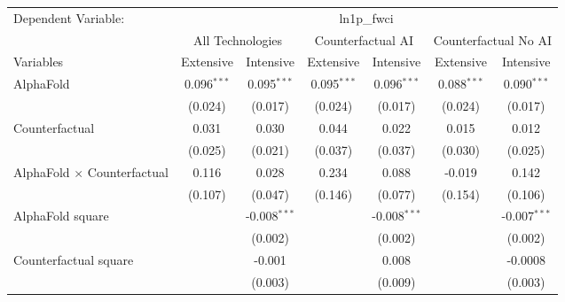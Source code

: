 \begingroup
\centering
\begin{tabular}{lcccccc}
   \tabularnewline \midrule \midrule
   Dependent Variable: & \multicolumn{6}{c}{ln1p\_fwci}\\
 & \multicolumn{2}{c}{All Technologies} & \multicolumn{2}{c}{Counterfactual AI} & \multicolumn{2}{c}{Counterfactual No AI} \\
\cmidrule(lr){1-1}\cmidrule(lr){2-3} \cmidrule(lr){4-5} \cmidrule(lr){6-7}
Variables & \multicolumn{1}{c}{Extensive} & \multicolumn{1}{c}{Intensive} & \multicolumn{1}{c}{Extensive} & \multicolumn{1}{c}{Intensive} & \multicolumn{1}{c}{Extensive} & \multicolumn{1}{c}{Intensive} \\
\cmidrule(lr){1-1}\cmidrule(lr){2-2} \cmidrule(lr){3-3} \cmidrule(lr){4-4} \cmidrule(lr){5-5} \cmidrule(lr){6-6} \cmidrule(lr){7-7}
   AlphaFold                          & 0.096$^{***}$ & 0.095$^{***}$  & 0.095$^{***}$ & 0.096$^{***}$  & 0.088$^{***}$ & 0.090$^{***}$\\   
                                      & (0.024)       & (0.017)        & (0.024)       & (0.017)        & (0.024)       & (0.017)\\   
   Counterfactual                     & 0.031         & 0.030          & 0.044         & 0.022          & 0.015         & 0.012\\   
                                      & (0.025)       & (0.021)        & (0.037)       & (0.037)        & (0.030)       & (0.025)\\   
   AlphaFold $\times$ Counterfactual  & 0.116         & 0.028          & 0.234         & 0.088          & -0.019        & 0.142\\   
                                      & (0.107)       & (0.047)        & (0.146)       & (0.077)        & (0.154)       & (0.106)\\   
   AlphaFold square                   &               & -0.008$^{***}$ &               & -0.008$^{***}$ &               & -0.007$^{***}$\\   
                                      &               & (0.002)        &               & (0.002)        &               & (0.002)\\   
   Counterfactual square              &               & -0.001         &               & 0.008          &               & -0.0008\\   
                                      &               & (0.003)        &               & (0.009)        &               & (0.003)\\   

\end{tabular}
